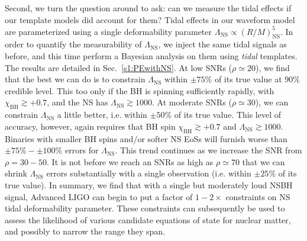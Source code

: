\documentclass[aps,prd,amsmath,floats,floatfix, twocolumn,
superscriptaddress,nofootinbib,showpacs]{revtex4-1}
\newcommand{\lambdans}{\Lambda_\mathrm{NS}}
\newcommand{\chibh}{\chi_\mathrm{BH}}
\begin{document}
Second, we turn the question around to ask: can we measure the tidal effects if
our template models did account for them? Tidal effects in our waveform model
are parameterized using a single deformability parameter 
$\lambdans\propto (R/M)_\mathrm{NS}^5$. In order to quantify the 
measurability of $\lambdans$, we inject the same tidal signals as before, and
this time perform a Bayesian analysis on them using {\it tidal} templates. 
The results are detailed in Sec.~\ref{s1:PEwithNS}.
% 
At low SNRs ($\rho\simeq 20$), we find that the best we can do is to constrain
$\lambdans$ within $\pm 75\%$ of its true value at $90\%$ credible level. This
too only if the BH is spinning sufficiently rapidly, with $\chibh\gtrsim +0.7$,
and the NS has $\lambdans\gtrsim 1000$. At moderate SNRs ($\rho\simeq 30$), we
can constrain $\lambdans$ a little better, i.e. within $\pm 50\%$ of its true
value. This level of accuracy, however, again requires that BH spin
$\chibh\gtrsim+0.7$ and $\lambdans\gtrsim 1000$. Binaries with smaller BH spins
and/or softer NS EoSs will furnish worse than $\pm 75\%-\pm 100\%$ errors for
$\lambdans$. This trend continues as we increase the SNR from $\rho=30-50$. It
is not before we reach an SNRs as high as $\rho\simeq 70$ that we can shrink
$\lambdans$ errors substantially with a single observation (i.e. within
$\pm 25\%$ of its true value).
% 
In summary, we find that with a single but moderately loud NSBH signal,
Advanced LIGO can begin to put a factor of $1-2\times$ constraints on NS tidal
deformability parameter. These constraints can subsequently be used to assess
the likelihood of various candidate equations of state for nuclear matter, and
possibly to narrow the range they span.
\end{document}
